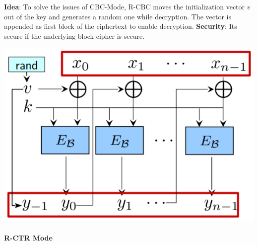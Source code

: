 \begin{minipage}{.55\linewidth}

\textbf{Idea}: To solve the issues of CBC-Mode, R-CBC moves the
initialization vector \(v\) out of the key and generates a random one
while decryption. The vector is appended as first block of the
ciphertext to enable decryption. \newline\newline \textbf{Security}: Its
secure if the underlying block cipher is secure.

\end{minipage}\hfill
\begin{minipage}{.4\linewidth}
    \includegraphics[width=\linewidth]{img/rcbc-mode}
\end{minipage}

\hypertarget{r-ctr-mode}{%
\paragraph{R-CTR Mode}\label{r-ctr-mode}}

